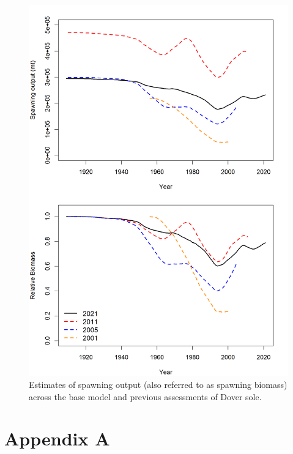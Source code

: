 \documentclass[11pt,
  english,
  a4paper,
]{article}
\begin{document}
\begin{figure}
\centering
\includegraphics[width=1\textwidth,height=1\textheight]{figs/assessment_history.png}
\caption{Estimates of spawning output (also referred to as spawning biomass) across the base model and previous assessments of Dover sole.\label{fig:past-assess}}
\end{figure}

\tagmcend\tagstructend

\clearpage


\hypertarget{appendix-a}{%
\section{Appendix A}\label{appendix-a}}

\leavevmode\tagmcend\tagstructend
\end{document}
